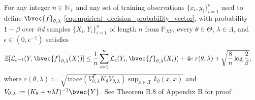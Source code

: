 \documentclass{llncs}
\begin{document}
	
	\begin{theorem}
		\label{thm:expected_risk_bound_hyperparameter_learning_copy}
		
		For any integer $n \in \mathbb{N}_{+}$ and any set of training observations $\{x_{i}, y_{i}\}_{i = 1}^{n}$ used to define $\bvec{f}_{\theta, \lambda}$ \eqref{eq:empirical_decision_probability_vector}, with probability $1 - \beta$ over \textit{iid} samples $\{X_{i}, Y_{i}\}_{i = 1}^{n}$ of length $n$ from $\mathbb{P}_{X Y}$, every $\theta \in \Theta$, $\lambda \in \Lambda$, and $\epsilon \in (0, e^{-1})$ satisfies
		\begin{equation}
		\begin{aligned}
		\mathbb{E}[\mathcal{L}_{e^{-1}}(Y, \bvec{f}_{\theta, \lambda}(X))] \leq \frac{1}{n} \sum_{i = 1}^{n} \mathcal{L}_{\epsilon}(Y_{i}, \bvec{f}_{\theta, \lambda}(X_{i})) + 4 e \; r(\theta, \lambda) + \sqrt{\frac{8}{n} \log{\frac{2}{\beta}}},
		\label{eq:expected_risk_bound_hyperparameter_learning_copy}
		\end{aligned}
		\end{equation}
		where $r(\theta, \lambda) := \sqrt{\mathrm{trace}(V_{\theta, \lambda}^{T} K_{\theta} V_{\theta, \lambda}) \sup_{x \in \mathcal{X}} k_{\theta}(x, x)}$ and $V_{\theta, \lambda} := (K_{\theta} + n \lambda I)^{-1} \bvec{Y}$.
		See Theorem B.8 of Appendix B for proof.
	\end{theorem}
	
\end{document}
